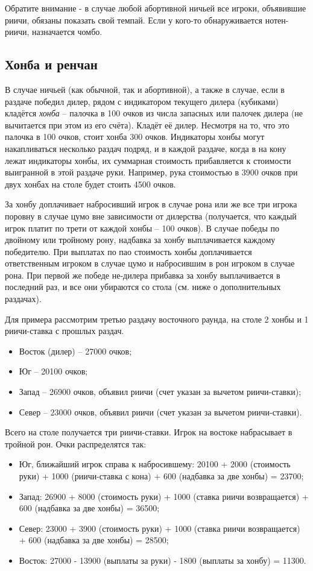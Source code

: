 Обратите внимание - в случае любой абортивной ничьей все игроки, объявившие риичи, обязаны показать свой темпай. Если у кого-то обнаруживается нотен-риичи, назначается чомбо.

\subsection{Хонба и ренчан}

В случае ничьей (как обычной, так и абортивной), а также в случае, если в раздаче победил дилер, рядом с индикатором текущего дилера (кубиками) кладётся \textit{хонба} – палочка в 100 очков из числа запасных или палочек дилера (не вычитается при этом из его счёта). Кладёт её дилер. Несмотря на то, что это палочка в 100 очков, стоит хонба 300 очков. Индикаторы хонбы могут накапливаться несколько раздач подряд, и в каждой раздаче, когда в на кону лежат индикаторы хонбы, их суммарная стоимость прибавляется к стоимости выигранной в этой раздаче руки. Например, рука стоимостью в 3900 очков при двух хонбах на столе будет стоить 4500 очков. 

За хонбу доплачивает набросивший игрок в случае рона или же все три игрока поровну в случае цумо вне зависимости от дилерства (получается, что каждый игрок платит по трети от каждой хонбы – 100 очков). В случае победы по двойному или тройному рону, надбавка за хонбу выплачивается каждому победителю. При выплатах по пао стоимость хонбы доплачивается ответственным игроком в случае цумо и набросившим в рон игроком в случае рона. При первой же победе не-дилера прибавка за хонбу выплачивается в последний раз, и все они убираются со стола (см. ниже о дополнительных раздачах).

Для примера рассмотрим третью раздачу восточного раунда, на столе 2 хонбы и 1 риичи-ставка с прошлых раздач.
\begin{itemize}
	\item Восток (дилер) – 27000 очков;
	\item Юг – 20100 очков;
	\item Запад – 26900 очков, объявил риичи (счет указан за вычетом риичи-ставки);
	\item Север – 23000 очков, объявил риичи (счет указан за вычетом риичи-ставки).
\end{itemize}

Всего на столе получается три риичи-ставки. Игрок на востоке набрасывает в тройной рон. Очки распределятся так:
\begin{itemize}
	\item Юг, ближайший игрок справа к набросившему: 20100 + 2000 (стоимость руки) + 1000 (риичи-ставка с кона) + 600 (надбавка за две хонбы) = 23700;
	\item Запад: 26900 + 8000 (стоимость руки) + 1000 (ставка риичи возвращается) + 600 (надбавка за две хонбы) = 36500;
	\item Север: 23000 + 3900 (стоимость руки) + 1000 (ставка риичи возвращается) + 600 (надбавка за две хонбы) = 28500;
	\item Восток: 27000 - 13900 (выплаты за руки) - 1800 (выплаты за хонбу) = 11300.
\end{itemize}

